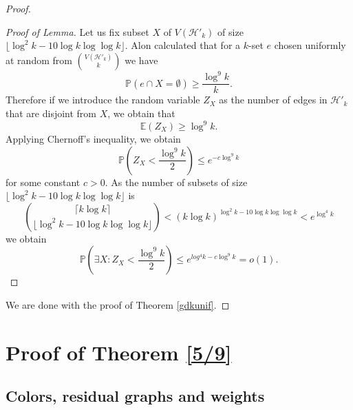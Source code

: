 \documentclass[12pt]{article}
\newcommand\cH{{\mathcal H}}
\begin{document}
\begin{proof}
\begin{proof}[Proof of Lemma]
Let us fix subset $X$ of $V(\cH'_k)$ of size $\lfloor\log^2k-10\log k\log\log k\rfloor$. Alon \cite{Alon} calculated that for a $k$-set $e$ chosen uniformly at random from $\binom{V(\cH'_k)}{k}$ we have $$\mathbb{P}(e\cap X=\emptyset)\ge \frac{\log^9 k}{k}.$$
Therefore if we introduce the random variable $Z_X$ as the number of edges in $\cH'_k$ that are disjoint from $X$, we obtain that $$\mathbb{E}(Z_X)\ge \log^9 k.$$ Applying Chernoff's inequality, we obtain $$\mathbb{P}\left(Z_X<\frac{\log^9k}{2}\right)\le e^{-c\log^9k}$$ for some constant $c > 0$. As the number of subsets of size $\lfloor\log^2k-10\log k\log\log k\rfloor$ is $$\binom{\lceil k\log k\rceil}{\lfloor\log^2k-10\log k\log\log k\rfloor}< (k\log k)^{\log^2k-10\log k\log\log k}< e^{\log^4k}$$ we obtain
\[
\mathbb{P}\left(\exists X:Z_X<\frac{\log^9k}{2}\right)\le e^{log^4k-c\log^9k}=o(1). 
\]
\end{proof}
\noindent
We are done with the proof of Theorem \ref{gdkunif}.
\end{proof}

\section{Proof of Theorem \ref{5/9}}
\label{pf:main}


\subsection*{Colors, residual graphs and weights}
\end{document}
